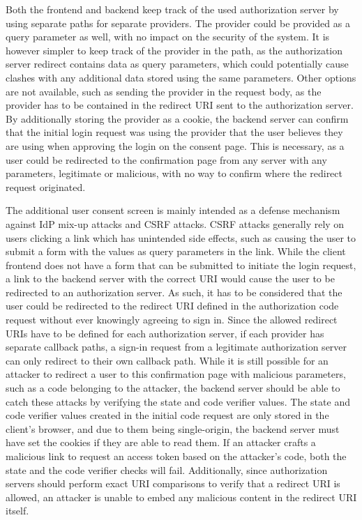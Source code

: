 Both the frontend and backend keep track of the used authorization server by using separate paths for separate providers.
The provider could be provided as a query parameter as well, with no impact on the security of the system.
It is however simpler to keep track of the provider in the path, as the authorization server redirect contains data as query parameters, which could potentially cause clashes with any additional data stored using the same parameters.
Other options are not available, such as sending the provider in the request body, as the provider has to be contained in the redirect URI sent to the authorization server.
By additionally storing the provider as a cookie, the backend server can confirm that the initial login request was using the provider that the user believes they are using when approving the login on the consent page.
This is necessary, as a user could be redirected to the confirmation page from any server with any parameters, legitimate or malicious, with no way to confirm where the redirect request originated.

The additional user consent screen is mainly intended as a defense mechanism against IdP mix-up attacks and CSRF attacks.
CSRF attacks generally rely on users clicking a link which has unintended side effects, such as causing the user to submit a form with the values as query parameters in the link.
While the client frontend does not have a form that can be submitted to initiate the login request, a link to the backend server with the correct URI would cause the user to be redirected to an authorization server.
As such, it has to be considered that the user could be redirected to the redirect URI defined in the authorization code request without ever knowingly agreeing to sign in.
Since the allowed redirect URIs have to be defined for each authorization server, if each provider has separate callback paths, a sign-in request from a legitimate authorization server can only redirect to their own callback path.
While it is still possible for an attacker to redirect a user to this confirmation page with malicious parameters, such as a code belonging to the attacker, the backend server should be able to catch these attacks by verifying the state and code verifier values.
The state and code verifier values created in the initial code request are only stored in the client's browser, and due to them being single-origin, the backend server must have set the cookies if they are able to read them.
If an attacker crafts a malicious link to request an access token based on the attacker's code, both the state and the code verifier checks will fail.
Additionally, since authorization servers should perform exact URI comparisons to verify that a redirect URI is allowed, an attacker is unable to embed any malicious content in the redirect URI itself.


